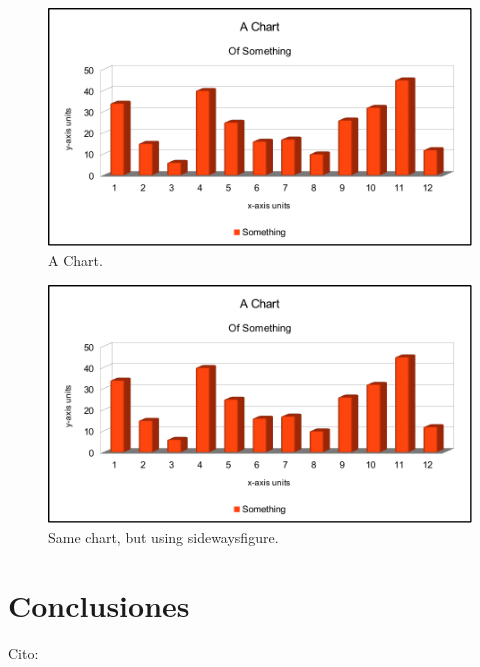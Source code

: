 \documentclass[double,12pt]{beavtex}
\begin{document}
{\begin{figure}
\begin{center}
	\includegraphics[width=14cm]{chart.pdf}
	\caption{A Chart.}
	\label{fig:chart}
	\end{center}
\end{figure}

\pagebreak[4]

\begin{figure}
\begin{center}
	\includegraphics[width=18cm]{chart.pdf}
	\caption{Same chart, but using sidewaysfigure.}
	\label{fig:rain}
	\end{center}
\end{figure}



\chapter{Conclusiones}

Cito: \\

}
\end{document}
